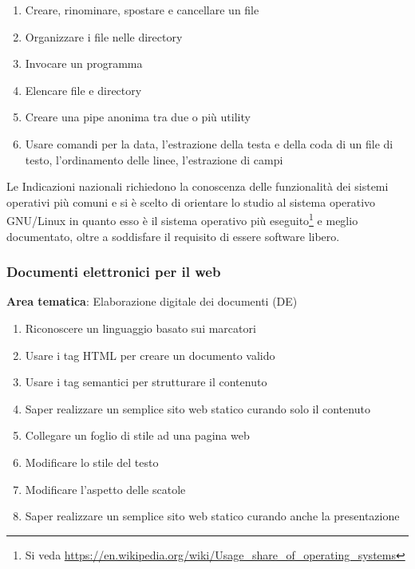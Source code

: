     
\begin{enumerate}
  \item Creare, rinominare, spostare e cancellare un file
  \item Organizzare i file nelle directory
  \item Invocare un programma
  \item Elencare file e directory
  \item Creare una pipe anonima tra due o più utility
  \item Usare comandi per la data, l'estrazione della testa e della coda di un file di testo, l'ordinamento delle linee, l'estrazione di campi
\end{enumerate}

Le Indicazioni nazionali richiedono la conoscenza delle funzionalità dei sistemi operativi più comuni
e si è scelto di orientare lo studio al sistema operativo GNU/Linux in quanto esso è il sistema operativo
più eseguito\footnote{Si veda \url{https://en.wikipedia.org/wiki/Usage_share_of_operating_systems}}
e meglio documentato, oltre a soddisfare il requisito di essere software libero.

\subsubsection[Web]{Documenti elettronici per il web}
\label{sec:web}

\noindent\textbf{Area tematica}: Elaborazione digitale dei documenti (DE)

    
\begin{enumerate}
  \item Riconoscere un linguaggio basato sui marcatori
  \item Usare i tag HTML per creare un documento valido
  \item Usare i tag semantici per strutturare il contenuto
  \item Saper realizzare un semplice sito web statico curando solo il contenuto
  \item Collegare un foglio di stile ad una pagina web
  \item Modificare lo stile del testo
  \item Modificare l'aspetto delle scatole
  \item Saper realizzare un semplice sito web statico curando anche la presentazione
\end{enumerate}

